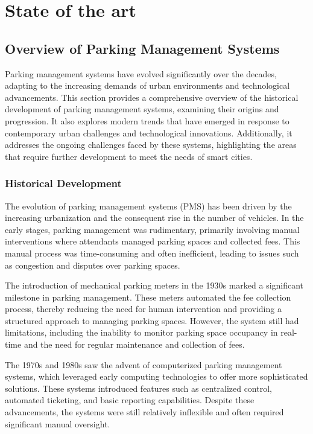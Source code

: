 \documentclass[oneside, 12pt, a4paper, draft]{book}
\begin{document}
\part{State of the art}
\label{sec:org264b54b}
\chapter{Overview of Parking Management Systems}
\label{sec:orgc93a148}
Parking management systems have evolved significantly over the decades, adapting to the increasing demands of urban environments and technological advancements. This section provides a comprehensive overview of the historical development of parking management systems, examining their origins and progression. It also explores modern trends that have emerged in response to contemporary urban challenges and technological innovations. Additionally, it addresses the ongoing challenges faced by these systems, highlighting the areas that require further development to meet the needs of smart cities.
\section{Historical Development}
\label{sec:org8feebdd}
The evolution of parking management systems (PMS) has been driven by the increasing urbanization and the consequent rise in the number of vehicles. In the early stages, parking management was rudimentary, primarily involving manual interventions where attendants managed parking spaces and collected fees. This manual process was time-consuming and often inefficient, leading to issues such as congestion and disputes over parking spaces.

The introduction of mechanical parking meters in the 1930s marked a significant milestone in parking management. These meters automated the fee collection process, thereby reducing the need for human intervention and providing a structured approach to managing parking spaces. However, the system still had limitations, including the inability to monitor parking space occupancy in real-time and the need for regular maintenance and collection of fees.

The 1970s and 1980s saw the advent of computerized parking management systems, which leveraged early computing technologies to offer more sophisticated solutions. These systems introduced features such as centralized control, automated ticketing, and basic reporting capabilities. Despite these advancements, the systems were still relatively inflexible and often required significant manual oversight.
\end{document}

